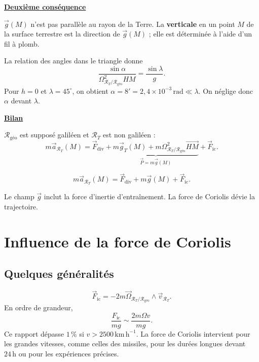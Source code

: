 \documentclass[11pt,a4paper]{article}
\newcommand{\titr}[1]{\par\textbf{\underline{#1}}\par\nopagebreak[3]}
\newcommand{\etoiles}[1]{\foreach \i in {1,...,#1}{\mathord{\star}\,}}
\newcommand{\R}{\mathcal R}
\newcommand{\RT}{\R_T}\newcommand{\RH}{\R_H}\newcommand{\RG}{\R_{\text{géo}}}
\newcommand{\Om}{\vec\Omega_{\RT/\RG}}\newcommand{\om}{\Omega_{\RT/\RG}}
\newcommand{\Fie}{\vec F_{\mathrm{ie}}}\newcommand{\Fic}{\vec F_{\mathrm{ic}}}\newcommand{\Fd}{\vec F_{\mathrm{div}}}
\newcommand{\HM}{\overrightarrow{HM}}\newcommand{\ur}{\vec u_r}
\begin{document}
\titr{Deuxième conséquence}
$\vec g(M)$ n'est pas parallèle au rayon de la Terre. La \textbf{verticale} en un point $M$ de la surface terrestre est la direction de $\vec g(M)$ ; elle est déterminée à l'aide d'un fil à plomb.
\begin{center}\end{center}
La relation des angles dans le triangle donne
\[\frac{\sin\alpha}{\om^2HM}=\frac{\sin\lambda}{g}.\]
Pour $h=0$ et $\lambda=45^\circ$, on obtient $\alpha=8'=2{,}4\times10^{-3}\,\mathrm{rad}\ll\lambda$. On néglige donc $\alpha$ devant $\lambda$.

\titr{Bilan}
$\RG$ est supposé galiléen et $\RT$ est non galiléen :
\[m\vec a_{\RT}(M)=\Fd+\underbrace{m\vec g_T(M)+m\om^2\HM}_{\vec P=m\vec g(M)}+\Fic.\]
\begin{cadre}[etoiles={\etoiles{4}}]\[m\vec a_{\RT}(M)=\Fd+m\vec g(M)+\Fic.\]\end{cadre}
Le champ $\vec g$ inclut la force d'inertie d'entraînement. La force de Coriolis dévie la trajectoire.

\section{Influence de la force de Coriolis}
\subsection{Quelques généralités}
\[\Fic=-2m\Om\wedge\vec v_{\RT}.\]
En ordre de grandeur,
\[\frac{F_{\mathrm{ic}}}{mg}\sim\frac{2m\Omega v}{mg}.\]
Ce rapport dépasse $1\,\%$ si $v>2500\,\mathrm{km\,h^{-1}}$. La force de Coriolis intervient pour les grandes vitesses, comme celles des missiles, pour les durées longues devant $24\,\mathrm h$ ou pour les expériences précises.
\end{document}
